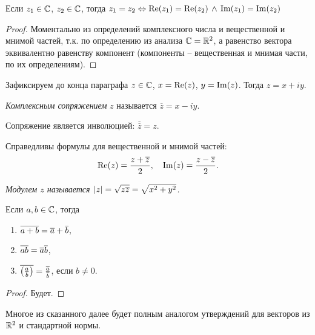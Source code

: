 \begin{proposition}
	Если $z_1 \in \mathbb{C}$, $z_2 \in \mathbb{C}$, тогда $z_1 = z_2 \Leftrightarrow \operatorname{Re}(z_1) = \operatorname{Re}(z_2) \,\land\, \operatorname{Im}(z_1) = \operatorname{Im}(z_2)$
\end{proposition}
\begin{proof}
	Моментально из определений комплексного числа и вещественной и мнимой частей, т.к. по определению из анализа $\mathbb{C} = \mathbb{R}^2$, а равенство вектора эквивалентно равенству компонент (компоненты -- вещественная и мнимая части, по их определениям).
\end{proof}

Зафиксируем до конца параграфа $z \in \mathbb{C}$, $x = \operatorname{Re}(z)$, $y = \operatorname{Im}(z)$. Тогда $z = x + iy$.

\begin{definition}
	\textit{Комплексным сопряжением} $z$ называется $\overline{z} = x - iy$.
\end{definition}
\begin{note}
	Сопряжение является инволюцией: $\overline{\overline{z}} = z$.
\end{note}
\begin{note}
	Справедливы формулы для вещественной и мнимой частей:
	\[
		\operatorname{Re}(z) = \frac{z + \overline{z}}{2}, \quad \operatorname{Im}(z) = \frac{z - \overline{z}}{2}.
	\]
\end{note}

\begin{definition}
	\it{Модулем} $z$ называется $\mathopen{}\left\lvert z \right\rvert = \sqrt{z \overline z} = \sqrt{x^2 + y^2}$.
\end{definition}

\begin{proposition}
	Если $a, b \in \mathbb{C}$, тогда
	\begin{enumerate}
		\item $\overline{a + b} = \overline a + \overline b$,
		\item $\overline{ab} = \overline a \overline b$,
		\item $\overline{\mathopen{}\left( \frac{a}{b} \right)\mathclose{}} = \frac{\overline a}{\overline b}$, если $b \neq 0$.
	\end{enumerate}
\end{proposition}
\begin{proof}
	Будет.
\end{proof}

\begin{anote}
	Многое из сказанного далее будет полным аналогом утверждений для векторов из $\mathbb{R}^2$ и стандартной нормы.
\end{anote}

